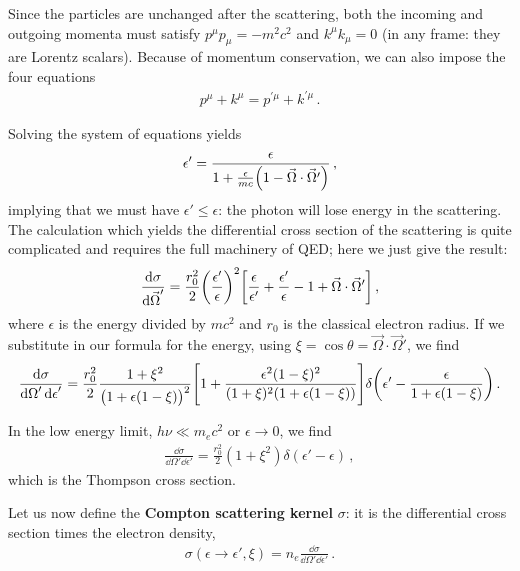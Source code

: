 \documentclass[main.tex]{subfiles}
\begin{document}
Since the particles are unchanged after the scattering, both the incoming and outgoing momenta must satisfy \(p^{\mu } p_{\mu } = - m^2 c^2\) and \(k^{\mu } k_{\mu } = 0\) (in any frame: they are Lorentz scalars). 
Because of momentum conservation, we can also impose the four equations 
%
\begin{align}
p^{\mu } + k^{\mu } = p^{\prime \mu } + k^{\prime \mu }
\,.
\end{align}

Solving the system of equations yields 
%
\begin{align}
\epsilon' = \frac{\epsilon }{1 + \frac{\epsilon }{mc} \qty(1 - \vec{\Omega} \cdot \vec{\Omega}')}
\,,
\end{align}
%
implying that we must have \(\epsilon' \leq \epsilon \): the photon will lose energy in the scattering. 
The calculation which yields the differential cross section of the scattering is quite complicated and requires the full machinery of QED; here we just give the result: 
%
\begin{align}
\frac{ \dd{\sigma }  }{ \dd{\vec{\Omega} }'} 
= \frac{r_0^2}{2 } \qty(\frac{\epsilon '}{\epsilon })^2
\qty[ \frac{\epsilon}{\epsilon '} + \frac{\epsilon'}{\epsilon } - 1 + \vec{\Omega} \cdot \vec{\Omega}'] 
\,,
\end{align}
%
where \(\epsilon \) is the energy divided by \(m c^2\) and \(r_0 \) is the classical electron radius. 
If we substitute in our formula for the energy, using \(\xi = \cos \theta = \vec{\Omega} \cdot \vec{\Omega}'\), we find 
%
\begin{align}
\frac{ \dd{\sigma }}{ \dd{\Omega }' \dd{\epsilon }'} 
= \frac{r_0^2}{2} \frac{1 + \xi^2}{\qty(1 + \epsilon (1 - \xi ))^2}
\qty[1 + \frac{\epsilon^2 (1 - \xi )^2}{(1 + \xi )^2 (1 + \epsilon (1 - \xi ))}]
\delta \qty(\epsilon ' - \frac{\epsilon }{1 + \epsilon (1 - \xi )})
\,.
\end{align}

In the low energy limit, \(h \nu \ll m_e c^2 \) or \(\epsilon \to 0\), we find 
%
\begin{align}
\frac{ \dd{\sigma }}{ \dd{\Omega }' \dd{\epsilon }'} 
=
\frac{r_0^2}{2} (1 + \xi^2) \delta (\epsilon ' - \epsilon )
\,,
\end{align}
%
which is the Thompson cross section. 

Let us now define the \textbf{Compton scattering kernel} \(\sigma \): it is the differential cross section times the electron density,
%
\begin{align}
\sigma (\epsilon \to \epsilon ', \xi ) = n_e \frac{ \dd{\sigma }}{ \dd{\Omega }' \dd{\epsilon }'}
\,.
\end{align}
\end{document}
